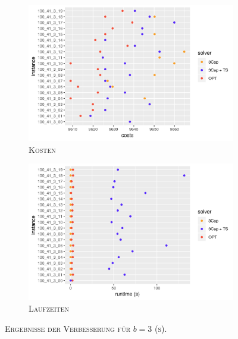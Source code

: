 \begin{figure}[H]
\centering
\begin{subfigure}[b]{0.47\textwidth}
\includegraphics[width=1.1\textwidth]{img/imp_b=3_s_costs.png}
\caption{\textsc{Kosten}}
\label{fig:imp_b=3_s_costs}
\end{subfigure}
\hfill
\begin{subfigure}[b]{0.47\textwidth}
\includegraphics[width=1.1\textwidth]{img/imp_b=3_s_runtimes.png}
\caption{\textsc{Laufzeiten}}
\label{fig:imp_b=3_s_runtimes}
\end{subfigure}
\caption{\textsc{Ergebnisse der Verbesserung für $b = 3$ (s)}.}
\label{fig:imp_res_b=3_s}
\end{figure}

